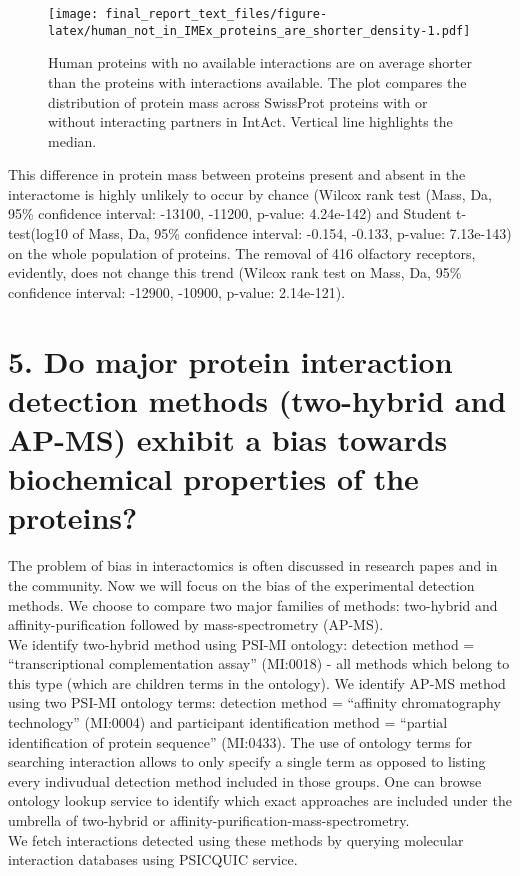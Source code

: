 \documentclass[12pt,]{report}
\begin{document}
\begin{figure}
\centering
\texttt{[image: final\_report\_text\_files/figure-latex/human\_not\_in\_IMEx\_proteins\_are\_shorter\_density-1.pdf]}
\caption{Human proteins with no available interactions are on average
shorter than the proteins with interactions available. The plot compares
the distribution of protein mass across SwissProt proteins with or
without interacting partners in IntAct. Vertical line highlights the
median.}
\end{figure}

This difference in protein mass between proteins present and absent in
the interactome is highly unlikely to occur by chance (Wilcox rank test
(Mass, Da, 95\% confidence interval: -13100, -11200, p-value: 4.24e-142)
and Student t-test(log10 of Mass, Da, 95\% confidence interval: -0.154,
-0.133, p-value: 7.13e-143) on the whole population of proteins. The
removal of 416 olfactory receptors, evidently, does not change this
trend (Wilcox rank test on Mass, Da, 95\% confidence interval: -12900,
-10900, p-value: 2.14e-121).

\section{5. Do major protein interaction detection methods (two-hybrid
and AP-MS) exhibit a bias towards biochemical properties of the
proteins?}\label{do-major-protein-interaction-detection-methods-two-hybrid-and-ap-ms-exhibit-a-bias-towards-biochemical-properties-of-the-proteins}

The problem of bias in interactomics is often discussed in research
papes and in the community. Now we will focus on the bias of the
experimental detection methods. We choose to compare two major families
of methods: two-hybrid and affinity-purification followed by
mass-spectrometry (AP-MS).\\
We identify two-hybrid method using PSI-MI ontology: detection method =
``transcriptional complementation assay'' (MI:0018) - all methods which
belong to this type (which are children terms in the ontology). We
identify AP-MS method using two PSI-MI ontology terms: detection method
= ``affinity chromatography technology'' (MI:0004) and participant
identification method = ``partial identification of protein sequence''
(MI:0433). The use of ontology terms for searching interaction allows to
only specify a single term as opposed to listing every indivudual
detection method included in those groups. One can browse ontology
lookup service to identify which exact approaches are included under the
umbrella of two-hybrid or affinity-purification-mass-spectrometry.\\
We fetch interactions detected using these methods by querying molecular
interaction databases using PSICQUIC service.
\end{document}
